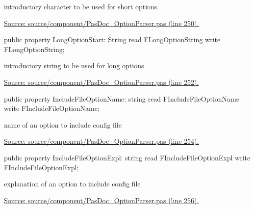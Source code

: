 \documentclass{report}
\newif\ifpdf
\begin{document}
\begin{list}{}
\begin{flushleft}
\ifpdf
\end{flushleft}
\fi


\par introductory character to be used for short options\par
\href{https://github.com/pasdoc/pasdoc/blob/master/source/component/PasDoc_OptionParser.pas#L250}{Source: source/component/PasDoc{\_}OptionParser.pas (line 250).}\label{PasDoc_OptionParser.TOptionParser-LongOptionStart}
\item[\textbf{LongOptionStart}\hfill]
\ifpdf
\begin{flushleft}
\fi
\begin{ttfamily}
public property LongOptionStart: String read FLongOptionString write FLongOptionString;\end{ttfamily}

\ifpdf
\end{flushleft}
\fi


\par introductory string to be used for long options\par
\href{https://github.com/pasdoc/pasdoc/blob/master/source/component/PasDoc_OptionParser.pas#L252}{Source: source/component/PasDoc{\_}OptionParser.pas (line 252).}\label{PasDoc_OptionParser.TOptionParser-IncludeFileOptionName}
\item[\textbf{IncludeFileOptionName}\hfill]
\ifpdf
\begin{flushleft}
\fi
\begin{ttfamily}
public property IncludeFileOptionName: string read FIncludeFileOptionName write FIncludeFileOptionName;\end{ttfamily}

\ifpdf
\end{flushleft}
\fi


\par name of an option to include config file\par
\href{https://github.com/pasdoc/pasdoc/blob/master/source/component/PasDoc_OptionParser.pas#L254}{Source: source/component/PasDoc{\_}OptionParser.pas (line 254).}\label{PasDoc_OptionParser.TOptionParser-IncludeFileOptionExpl}
\item[\textbf{IncludeFileOptionExpl}\hfill]
\ifpdf
\begin{flushleft}
\fi
\begin{ttfamily}
public property IncludeFileOptionExpl: string read FIncludeFileOptionExpl write FIncludeFileOptionExpl;\end{ttfamily}

\ifpdf
\end{flushleft}
\fi


\par explanation of an option to include config file\par
\href{https://github.com/pasdoc/pasdoc/blob/master/source/component/PasDoc_OptionParser.pas#L256}{Source: source/component/PasDoc{\_}OptionParser.pas (line 256).}\end{list}
\end{document}

